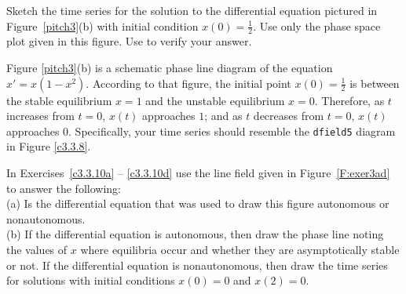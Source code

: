 \documentclass{ximera}
\begin{document}
\begin{exercise} \label{c3.3.8}
Sketch the time series for the solution to the differential
equation pictured in Figure~\ref{pitch3}(b) with initial condition
$x(0)=\frac{1}{2}$.  Use only the phase space plot given in this
figure.  Use {\dfield} to verify your answer.

\begin{solution}

Figure \ref{pitch3}(b) is a schematic
phase line diagram of the equation $x' = x(1 - x^2)$.  According
to that figure, the initial point $x(0) = \frac{1}{2}$ is between
the stable equilibrium $x = 1$ and the unstable equilibrium
$x = 0$.  Therefore, as $t$ increases from $t = 0$, $x(t)$
approaches $1$; and as $t$ decreases from $t = 0$, $x(t)$
approaches $0$.  Specifically, your time series should resemble
the {\tt dfield5} diagram in Figure \ref{c3.3.8}.

\begin{figure}[htb]
                       \centerline{%
                       }
\end{figure}

\end{solution}
\end{exercise}

\noindent In Exercises~\ref{c3.3.10a} -- \ref{c3.3.10d} use the line field 
given in Figure~\ref{F:exer3ad} to answer the following:\\
\noindent (a) Is the differential equation that was used to draw this figure 
autonomous or nonautonomous.\\
\noindent (b)  If the differential equation is autonomous, then draw the phase
line noting the values of $x$ where equilibria occur and whether they are 
asymptotically stable or not. If the differential equation is nonautonomous, 
then draw the time series for solutions with initial conditions $x(0)=0$ and 
$x(2)=0$.
\end{document}
